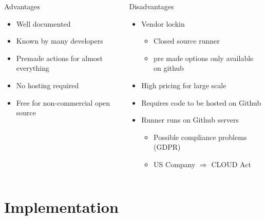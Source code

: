 \documentclass[compress,aspectratio=169]{beamer}
\begin{document}
	\begin{frame}{}
    \begin{columns}
      \begin{column}{0.5\textwidth}
        \begin{block}{Advantages}
          \begin{itemize}
            \item Well documented
            \item Known by many developers
            \item Premade actions for almost everything
            \item No hosting required
            \item Free for non-commercial open source
          \end{itemize}
        \end{block}
      \end{column}
      \begin{column}{0.5\textwidth}
        \begin{block}{Disadvantages}
          \begin{itemize}
            \item Vendor lockin
              \begin{itemize}
                \item Closed source runner
                \item pre made options only available on github
              \end{itemize}
            \item High pricing for large scale
            \item Requires code to be hosted on Github
            \item Runner runs on Github servers
              \begin{itemize}
                \item Possible compliance problems (GDPR)
                \item US Company $\Rightarrow$ CLOUD Act
              \end{itemize}
          \end{itemize}
        \end{block}
      \end{column}
    \end{columns}
	\end{frame}

  \section{Implementation}
\end{document}
